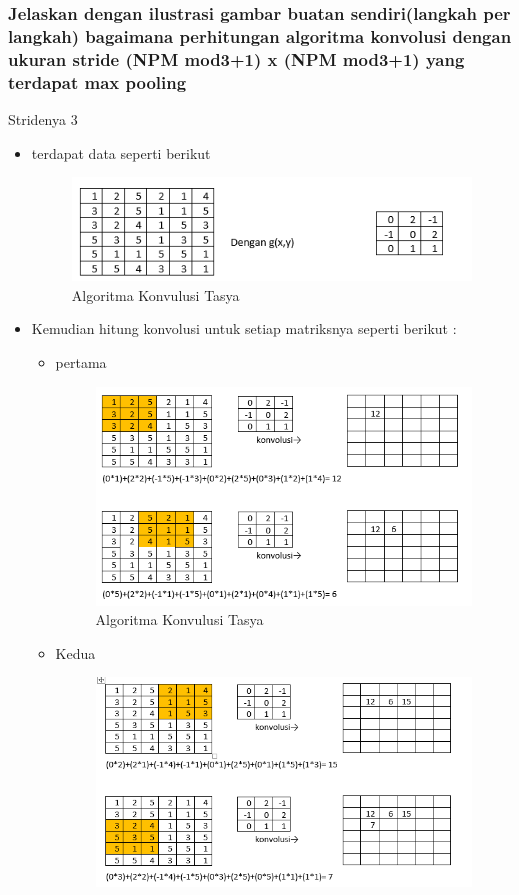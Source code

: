 \subsubsection{Jelaskan dengan ilustrasi gambar buatan sendiri(langkah per langkah) bagaimana perhitungan algoritma konvolusi dengan ukuran stride (NPM mod3+1) x (NPM mod3+1) yang terdapat max pooling}
Stridenya 3
\begin{itemize}
\item terdapat data seperti berikut 
\begin{figure}[ht]
\centering
\includegraphics[scale=0.5]{figures/Chapter 7/1164086/Teori/chapter7tasya7.png}
\caption{Algoritma Konvulusi Tasya}
\label{Teori}
\end{figure}
\item Kemudian hitung konvolusi untuk setiap matriksnya seperti berikut :
\begin{itemize}
\item pertama
\begin{figure}[ht]
\centering
\includegraphics[scale=0.5]{figures/Chapter 7/1164086/Teori/chapter7tasya8.png}
\caption{Algoritma Konvulusi Tasya}
\label{Teori}
\end{figure}
\item Kedua
\begin{figure}[ht]
\centering
\includegraphics[scale=0.5]{figures/Chapter 7/1164086/Teori/chapter7tasya9.png}

\end{figure}
\end{itemize}
\end{itemize}
